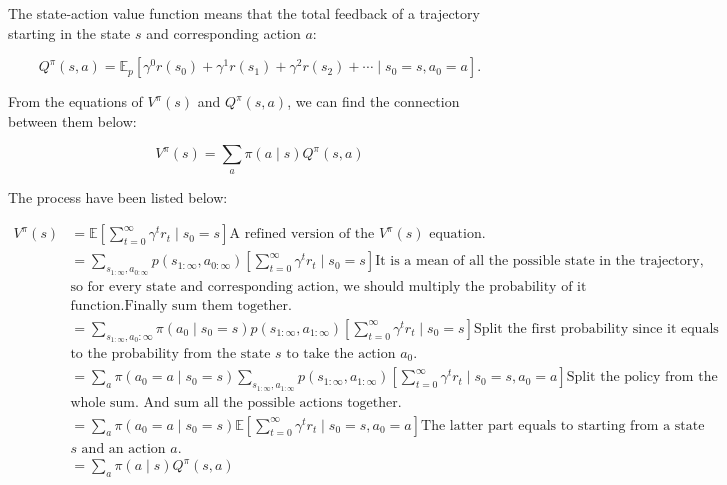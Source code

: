 \documentclass[11pt]{article}
\begin{document}
The state-action value function means that the total feedback of a trajectory starting in the state $s$ and corresponding action $a$:

$$Q^{\pi}(s, a)=\mathbb{E}_{p}\left[\gamma^{0} r\left(s_{0}\right)+\gamma^{1} r\left(s_{1}\right)+\gamma^{2} r\left(s_{2}\right)+\cdots \mid s_{0}=s, a_{0}=a\right].$$

From the equations of $V^{\pi}(s)$ and $Q^{\pi}(s, a)$, we can find the connection between them below:

$$V^{\pi}(s)=\sum_{a} \pi(a \mid s) Q^{\pi}(s, a)$$

The process have been listed below: 

\begin{align*}
V^{\pi}(s) &=\mathbb{E}\left[\sum_{t=0}^{\infty} \gamma^{t} r_{t} \mid s_{0}=s\right] \text{A refined version of the $V^{\pi}(s)$ equation.} \\
&=\sum_{s_{1: \infty}, a_{0: \infty}} p\left(s_{1: \infty}, a_{0: \infty}\right)\left[\sum_{t=0}^{\infty} \gamma^{t} r_{t} \mid s_{0}=s\right] \text{It is a mean of all the possible state in the trajectory,} \\ & \text{so for every state and corresponding action, we should multiply the probability of it with reward } \\ & \text{function.Finally sum them together.}\\
&=\sum_{s_{1: \infty}, a_{0}: \infty} \pi\left(a_{0} \mid s_{0}=s\right) p\left(s_{1: \infty}, a_{1: \infty}\right)\left[\sum_{t=0}^{\infty} \gamma^{t} r_{t} \mid s_{0}=s\right] \text{Split the first probability since it equals } \\ & \text{to the probability from the state $s$ to take the action $a_0$.} \\
&=\sum_{a} \pi\left(a_{0}=a \mid s_{0}=s\right) \sum_{s_{1: \infty}, a_{1: \infty}} p\left(s_{1: \infty}, a_{1: \infty}\right)\left[\sum_{t=0}^{\infty} \gamma^{t} r_{t} \mid s_{0}=s, a_{0}=a\right] \text{Split the policy from the } \\ & \text{whole sum. And sum all the possible actions together.}\\
&=\sum_{a} \pi\left(a_{0}=a \mid s_{0}=s\right) \mathbb{E}\left[\sum_{t=0}^{\infty} \gamma^{t} r_{t} \mid s_{0}=s, a_{0}=a\right] \text{The latter part equals to starting from a state } \\ & \text{$s$ and an action $a$.}\\
&=\sum_{a} \pi(a \mid s) Q^{\pi}(s, a)
\end{align*}
\end{document}
